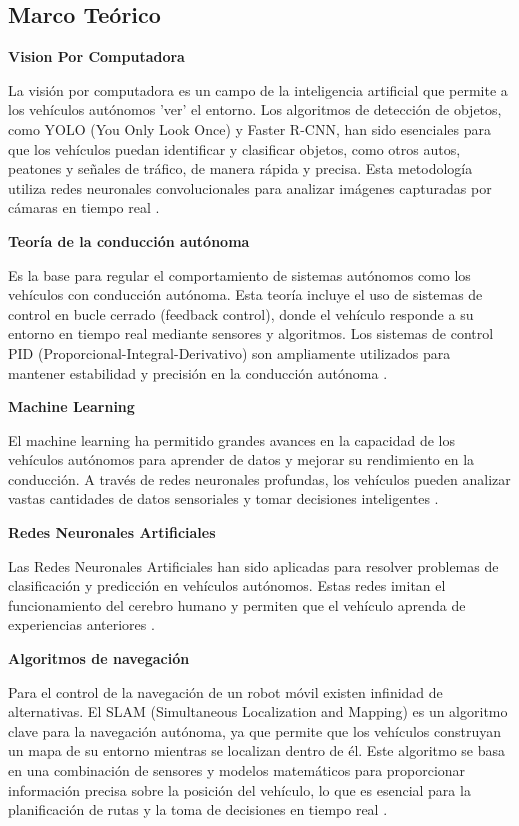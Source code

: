 \subsection{Marco Teórico}

\textbf{Vision Por Computadora}

La visión por computadora es un campo de la inteligencia artificial que permite a los vehículos autónomos 'ver' el entorno. Los algoritmos de detección de objetos, como YOLO (You Only Look Once) y Faster R-CNN, han sido esenciales para que los vehículos puedan identificar y clasificar objetos, como otros autos, peatones y señales de tráfico, de manera rápida y precisa. Esta metodología utiliza redes neuronales convolucionales para analizar imágenes capturadas por cámaras en tiempo real \cite{Vision}.

\textbf{Teoría de la conducción autónoma}

Es la base para regular el comportamiento de sistemas autónomos como los vehículos con conducción autónoma. Esta teoría incluye el uso de sistemas de control en bucle cerrado (feedback control), donde el vehículo responde a su entorno en tiempo real mediante sensores y algoritmos. Los sistemas de control PID (Proporcional-Integral-Derivativo) son ampliamente utilizados para mantener estabilidad y precisión en la conducción autónoma \cite{teoria}.

\textbf{Machine Learning}

El machine learning ha permitido grandes avances en la capacidad de los vehículos autónomos para aprender de datos y mejorar su rendimiento en la conducción. A través de redes neuronales profundas, los vehículos pueden analizar vastas cantidades de datos sensoriales y tomar decisiones inteligentes \cite{ML}.

\textbf{Redes Neuronales Artificiales}

Las Redes Neuronales Artificiales han sido aplicadas para resolver problemas de clasificación y predicción en vehículos autónomos. Estas redes imitan el funcionamiento del cerebro humano y permiten que el vehículo aprenda de experiencias anteriores \cite{RN}.


\textbf{Algoritmos de navegación} 

Para el control de la navegación de un robot móvil existen infinidad de alternativas. El SLAM (Simultaneous Localization and Mapping) es un algoritmo clave para la navegación autónoma, ya que permite que los vehículos construyan un mapa de su entorno mientras se localizan dentro de él. Este algoritmo se basa en una combinación de sensores y modelos matemáticos para proporcionar información precisa sobre la posición del vehículo, lo que es esencial para la planificación de rutas y la toma de decisiones en tiempo real \cite{An}.

